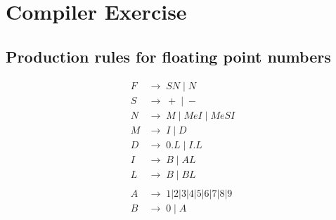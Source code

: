 \documentclass[a4paper, 12pt, oneside]{book}
\begin{document}
\begin{enumerate}
\end{enumerate}


\newpage


\section{Compiler Exercise}

\subsection{Production rules for floating point numbers}

\begin{align*}
  F & \rightarrow \; SN \; | \; N                      \\
  S & \rightarrow \; + \; | \; -                       \\
  N & \rightarrow \; M \; | \; MeI \; | \; MeSI        \\
  M & \rightarrow \; I \; | \; D                       \\
  D & \rightarrow \; 0.L \; | \; I.L                   \\
  I & \rightarrow \; B \; | \; AL                      \\
  L & \rightarrow \; B \; | \; BL                      \\
  \\
  A & \rightarrow \; 1 | 2 | 3 | 4 | 5 | 6 | 7 | 8 | 9 \\
  B & \rightarrow \; 0 \; | \; A
\end{align*}
\end{document}
